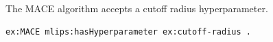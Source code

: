 The MACE algorithm accepts a cutoff radius hyperparameter.
\begin{lstlisting}[language=turtle]
ex:MACE mlips:hasHyperparameter ex:cutoff-radius .
\end{lstlisting}
